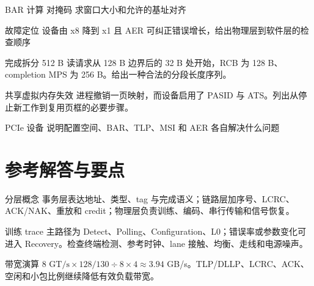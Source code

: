 \begin{chapterexercise}{BAR 计算}
对掩码  求窗口大小和允许的基址对齐
\end{chapterexercise}

\begin{chapterexercise}{故障定位}
设备由 x8 降到 x1 且 AER 可纠正错误增长，给出物理层到软件层的检查顺序
\end{chapterexercise}

\begin{chapterexercise}{完成拆分}
512 B 读请求从 128 B 边界后的 32 B 处开始，RCB 为 128 B、completion MPS 为 256 B。给出一种合法的分段长度序列。
\end{chapterexercise}

\begin{chapterexercise}{共享虚拟内存失效}
进程撤销一页映射，而设备启用了 PASID 与 ATS。列出从停止新工作到复用页框的必要步骤。
\end{chapterexercise}

\begin{chapterexercise}{PCIe 设备}
说明配置空间、BAR、TLP、MSI 和 AER 各自解决什么问题
\end{chapterexercise}

\section*{参考解答与要点}

\begin{chapteranswer}{分层概念}
事务层表达地址、类型、tag 与完成语义；链路层加序号、LCRC、ACK/NAK、重放和 credit；物理层负责训练、编码、串行传输和信号恢复。
\end{chapteranswer}

\begin{chapteranswer}{训练 trace}
主路径为 Detect、Polling、Configuration、L0；错误率或参数变化可进入 Recovery。检查终端检测、参考时钟、lane 接触、均衡、走线和电源噪声。
\end{chapteranswer}

\begin{chapteranswer}{带宽演算}
$8\text{ GT/s}\times128/130\div8\times4\approx3.94$ GB/s。TLP/DLLP、LCRC、ACK、空闲和小包比例继续降低有效负载带宽。
\end{chapteranswer}

